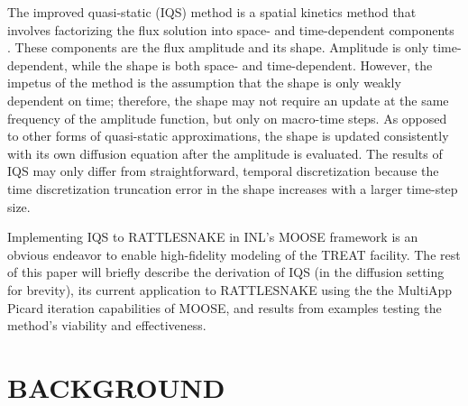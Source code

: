 \documentclass[12pt]{article}
\begin{document}
The improved quasi-static (IQS) method is a spatial kinetics method that involves factorizing the flux solution into space- and time-dependent components \cite{Ott_1966,Dulla2008}.  These components are the flux amplitude and its shape. Amplitude is only time-dependent, while the shape is both space- and time-dependent.  However, the impetus of the method is the assumption that the shape is only weakly dependent on time; therefore, the shape may not require an update at the same frequency of the amplitude function, but only on macro-time steps. As opposed to other forms of quasi-static approximations, the shape is updated consistently with its own diffusion equation after the amplitude is evaluated.  The results of IQS may only differ from straightforward, temporal discretization because the time discretization truncation error in the shape increases with a larger time-step size. 

Implementing IQS to RATTLESNAKE in INL's MOOSE framework is an obvious endeavor to enable high-fidelity modeling of the TREAT facility. The rest of this paper will briefly describe the derivation of IQS (in the diffusion setting for brevity), its current application to RATTLESNAKE using the the MultiApp Picard iteration capabilities of MOOSE, and results from examples testing the method's viability and effectiveness.

%
\section{BACKGROUND}
\label{sect::background}
\end{document}
